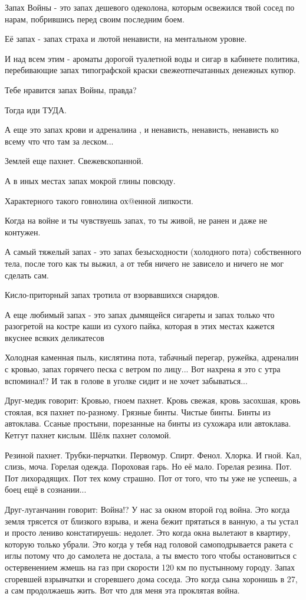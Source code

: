Запах Войны - это запах дешевого одеколона, которым освежился твой сосед по
нарам, побрившись перед своим последним боем.

Её запах - запах страха и лютой ненависти, на ментальном уровне.

И над всем этим - ароматы дорогой туалетной воды и сигар в кабинете политика,
перебивающие запах типографской краски свежеотпечатанных денежных купюр.

Тебе нравится запах Войны, правда?

Тогда иди ТУДА.

А еще это запах крови и адреналина , и ненависть, ненависть, ненависть ко всему
что что там за леском...

Землей еще пахнет. Свежевскопанной.

А в иных местах запах мокрой глины повсюду.

Характерного такого говнолина ох@енной липкости.

Когда на войне и ты чувствуешь запах, то ты живой, не ранен и даже не контужен.

А самый тяжелый запах - это запах безысходности (холодного пота) собственного
тела, после того как ты выжил, а от тебя ничего не зависело и ничего не мог
сделать сам.

Кисло-приторный запах тротила от взорвавшихся снарядов.

А еще любимый запах - это запах дымящейся сигареты и запах только что
разогретой на костре каши из сухого пайка, которая в этих местах кажется
вкуснее всяких деликатесов

Холодная каменная пыль, кислятина пота, табачный перегар, ружейка, адреналин с
кровью, запах горячего песка с ветром по лицу... Вот нахрена я это с утра
вспоминал!? И так в голове в уголке сидит и не хочет забываться...

Друг-медик говорит: Кровью, гноем пахнет. Кровь свежая, кровь засохшая, кровь
стоялая, вся пахнет по-разному. Грязные бинты. Чистые бинты. Бинты из
автоклава. Ссаные простыни, порезанные на бинты из сухожара или автоклава.
Кетгут пахнет кислым. Шёлк пахнет соломой.

Резиной пахнет. Трубки-перчатки. Первомур. Спирт. Фенол. Хлорка. И гной. Кал,
слизь, моча. Горелая одежда. Пороховая гарь. Но её мало. Горелая резина. Пот.
Пот лихорадящих. Пот тех кому страшно. Пот от того, что ты уже не успеешь, а
боец ещё в сознании...

Друг-луганчанин говорит: Война!? У нас за окном второй год война. Это когда
земля трясется от близкого взрыва, и жена бежит прятаться в ванную, а ты устал
и просто лениво констатируешь: недолет. Это когда окна вылетают в квартиру,
которую только убрали. Это когда у тебя над головой самоподрывается ракета с
иглы потому что до самолета не достала, а ты вместо того чтобы остановиться с
остервенением жмешь на газ при скорости 120 км по пустынному городу. Запах
сгоревшей взрывчатки и сгоревшего дома соседа. Это когда сына хоронишь в 27, а
сам продолжаешь жить. Вот что для меня эта проклятая война.

